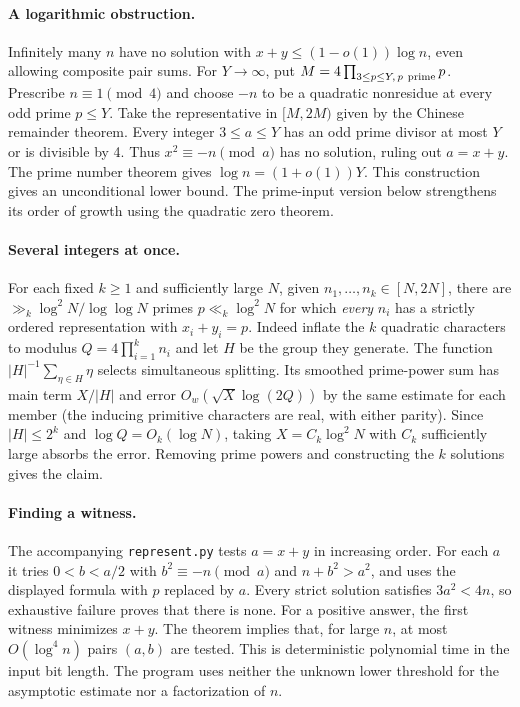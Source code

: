 \documentclass[11pt]{article}
\begin{document}
\paragraph{A logarithmic obstruction.}
Infinitely many $n$ have no solution with $x+y\le(1-o(1))\log n$,
even allowing composite pair sums. For $Y\to\infty$, put
$M=4\prod_{3\le p\le Y,\,p\ {\rm prime}}p$. Prescribe $n\equiv1\pmod4$
and choose $-n$ to be a quadratic nonresidue at every odd prime $p\le Y$.
Take the representative in $[M,2M)$ given by the Chinese remainder theorem.
Every integer $3\le a\le Y$ has an odd prime divisor at most $Y$ or is
divisible by 4. Thus $x^2\equiv -n\pmod a$ has no solution, ruling out
$a=x+y$. The prime number theorem gives $\log n=(1+o(1))Y$.
This construction gives an unconditional lower bound. The prime-input version below strengthens its order of growth using the quadratic zero theorem.

\paragraph{Several integers at once.}
For each fixed $k\ge1$ and sufficiently large $N$, given
$n_1,\dots,n_k\in[N,2N]$, there are
$\gg_k\log^2 N/\log\log N$ primes $p\ll_k\log^2 N$ for which
\emph{every} $n_i$ has a strictly ordered representation with $x_i+y_i=p$.
Indeed inflate the $k$ quadratic characters to modulus
$Q=4\prod_{i=1}^k n_i$ and let $H$ be the group they generate.
The function $|H|^{-1}\sum_{\eta\in H}\eta$ selects simultaneous splitting.
Its smoothed prime-power sum has main term $X/|H|$ and error
$O_w(\sqrt X\log(2Q))$ by the same estimate for each member
(the inducing primitive characters are real, with either parity).
Since $|H|\le2^k$ and $\log Q=O_k(\log N)$, taking
$X=C_k\log^2 N$ with $C_k$ sufficiently large absorbs the error.
Removing prime powers and constructing the $k$ solutions gives the claim.

\paragraph{Finding a witness.}
The accompanying \texttt{represent.py} tests $a=x+y$ in increasing order.
For each $a$ it tries $0<b<a/2$ with $b^2\equiv-n\pmod a$ and
$n+b^2>a^2$, and uses the displayed formula with $p$ replaced by $a$.
Every strict solution satisfies $3a^2<4n$, so exhaustive failure proves
that there is none. For a positive answer, the first witness minimizes $x+y$.
The theorem implies that, for large $n$, at most $O(\log^4 n)$ pairs $(a,b)$
are tested. This is deterministic polynomial time in the input bit length.
The program uses neither the unknown lower threshold for the asymptotic
estimate nor a factorization of $n$.
\end{document}
